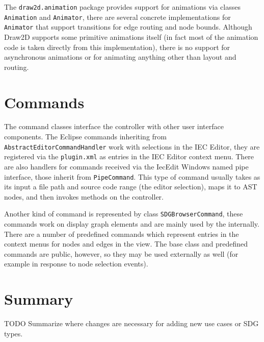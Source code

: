 The \lstinline|draw2d.animation| package provides support for animations via classes \lstinline|Animation| and 
\lstinline|Animator|, there are several concrete implementations for \lstinline|Animator| that support transitions for 
edge routing and node bounds. Although Draw2D supports some primitive animations itself (in fact most of the animation 
code is taken directly from this implementation), there is no support for asynchronous animations or for animating 
anything other than layout and routing.


\section{Commands}

The command classes interface the \SB controller with other user interface components. The Eclipse commands inheriting 
from \lstinline|AbstractEditorCommandHandler| work with selections in the IEC Editor, they are registered via the \SB 
\lstinline|plugin.xml| as entries in the IEC Editor context menu. There are also handlers for commands received via the 
IecEdit Windows named pipe interface, those inherit from \lstinline|PipeCommand|. This type of command usually takes as 
its input a file path and source code range (the editor selection), maps it to AST nodes, and then invokes methods on 
the \SB controller.

Another kind of command is represented by class \lstinline|SDGBrowserCommand|, these commands work on display graph 
elements and are mainly used by the \SB internally. There are a number of predefined commands which represent entries 
in the context menus for nodes and edges in the \SB view. The base class and predefined commands are public, however, 
so they may be used externally as well (for example in response to node selection events).


\section{Summary}

TODO Summarize where changes are necessary for adding new use cases or SDG types.

